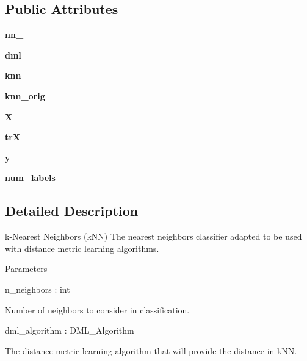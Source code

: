 \subsection*{Public Attributes}
\begin{DoxyCompactItemize}
\item 
{\bfseries nn\+\_\+}\hypertarget{classdml_1_1knn_1_1kNN_a98518ccd2393c1accf7cd00b5c12e64e}{}\label{classdml_1_1knn_1_1kNN_a98518ccd2393c1accf7cd00b5c12e64e}

\item 
{\bfseries dml}\hypertarget{classdml_1_1knn_1_1kNN_afae3f36666eb8599a00b669cca4661fe}{}\label{classdml_1_1knn_1_1kNN_afae3f36666eb8599a00b669cca4661fe}

\item 
{\bfseries knn}\hypertarget{classdml_1_1knn_1_1kNN_ab7f8587bd0e2a62e69e2bd7e3381237f}{}\label{classdml_1_1knn_1_1kNN_ab7f8587bd0e2a62e69e2bd7e3381237f}

\item 
{\bfseries knn\+\_\+orig}\hypertarget{classdml_1_1knn_1_1kNN_a0dc9258a999119dce46e826237aed660}{}\label{classdml_1_1knn_1_1kNN_a0dc9258a999119dce46e826237aed660}

\item 
{\bfseries X\+\_\+}\hypertarget{classdml_1_1knn_1_1kNN_a02f20eaff49e6fcf58d7ebd999e0cbf1}{}\label{classdml_1_1knn_1_1kNN_a02f20eaff49e6fcf58d7ebd999e0cbf1}

\item 
{\bfseries trX}\hypertarget{classdml_1_1knn_1_1kNN_a18a7c348e1a1e1b70c46ebe40862df66}{}\label{classdml_1_1knn_1_1kNN_a18a7c348e1a1e1b70c46ebe40862df66}

\item 
{\bfseries y\+\_\+}\hypertarget{classdml_1_1knn_1_1kNN_aa7c609ab7cd4b7dffef63778468b8220}{}\label{classdml_1_1knn_1_1kNN_aa7c609ab7cd4b7dffef63778468b8220}

\item 
{\bfseries num\+\_\+labels}\hypertarget{classdml_1_1knn_1_1kNN_aadad7d878aacd2fbb1eeef2d098a89d8}{}\label{classdml_1_1knn_1_1kNN_aadad7d878aacd2fbb1eeef2d098a89d8}

\end{DoxyCompactItemize}


\subsection{Detailed Description}
\begin{DoxyVerb}    k-Nearest Neighbors (kNN)
    The nearest neighbors classifier adapted to be used with distance metric learning algorithms.

    Parameters
    ----------

    n_neighbors : int

        Number of neighbors to consider in classification.

    dml_algorithm : DML_Algorithm

        The distance metric learning algorithm that will provide the distance in kNN.
\end{DoxyVerb}
 

